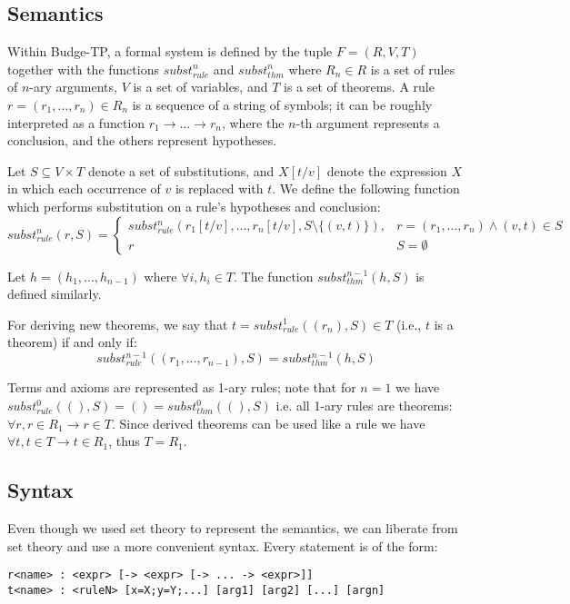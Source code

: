 \documentclass{article}
\begin{document}
\subsection{Semantics}

Within Budge-TP, a formal system is defined by the tuple $F = (R, V, T)$ together with the functions $subst_{rule}^n$ and $subst_{thm}^n$ where $R_n \in R$ is a set of rules of $n$-ary arguments, $V$ is a set of variables, and $T$ is a set of theorems. A rule $r = (r_1, \ldots, r_n) \in R_n$ is a sequence of a string of symbols; it can be roughly interpreted as a function $r_1 \to \ldots \to r_n$, where the $n$-th argument represents a conclusion, and the others represent hypotheses.

Let $S \subseteq V \times T$ denote a set of substitutions, and $X[t/v]$ denote the expression $X$ in which each occurrence of $v$ is replaced with $t$. We define the following function which performs substitution on a rule's hypotheses and conclusion:
$$ subst_{rule}^n(r, S) = {
\begin{cases}
subst_{rule}^n(r_1[t/v], \ldots, r_n[t/v], S \setminus \{(v, t) \}), & r = (r_1, \ldots, r_n) \land (v, t) \in S \\
r & S = \emptyset
\end{cases}}
$$

Let $h = (h_1, \ldots, h_{n-1})$ where $\forall i, h_i \in T$. The function $subst_{thm}^{n-1}(h, S)$ is defined similarly.

For deriving new theorems, we say that $t = subst_{rule}^1((r_n), S) \in T$ (i.e., $t$ is a theorem) if and only if:
$$subst_{rule}^{n-1}((r_1, \ldots, r_{n-1}), S) = subst_{thm}^{n-1}(h, S)$$

Terms and axioms are represented as 1-ary rules; note that for $n = 1$ we have $subst_{rule}^0((), S) = () = subst_{thm}^0((), S)$ i.e. all 1-ary rules are theorems: $\forall r, r \in R_1 \to r \in T$. Since derived theorems can be used like a rule we have $\forall t, t \in T \to t \in R_1$, thus $T = R_1$.

\subsection{Syntax}

Even though we used set theory\cite{b6} to represent the semantics, we can liberate from set theory and use a more convenient syntax. Every statement is of the form:

\begin{verbatim}
r<name> : <expr> [-> <expr> [-> ... -> <expr>]]
t<name> : <ruleN> [x=X;y=Y;...] [arg1] [arg2] [...] [argn]
\end{verbatim}
\end{document}
